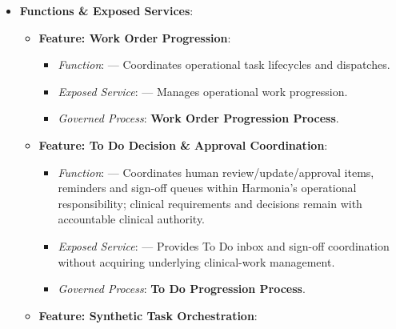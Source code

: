 \begin{itemize}
\item
\textbf{Functions \& Exposed Services}:


\begin{itemize}

\item
\textbf{Feature: Work Order Progression}:


\begin{itemize}

\item
\emph{Function}: \texttt{} — Coordinates operational task lifecycles and dispatches.



\item
\emph{Exposed Service}: \texttt{} — Manages operational work progression.



\item
\emph{Governed Process}: \textbf{Work Order Progression Process}.



\end{itemize}


\item
\textbf{Feature: To Do Decision \& Approval Coordination}:


\begin{itemize}

\item
\emph{Function}: \texttt{} — Coordinates human review/\allowbreak{}update/\allowbreak{}approval items, reminders and sign-off queues within Harmonia's operational responsibility; clinical requirements and decisions remain with accountable clinical authority.



\item
\emph{Exposed Service}: \texttt{} — Provides To Do inbox and sign-off coordination without acquiring underlying clinical-work management.



\item
\emph{Governed Process}: \textbf{To Do Progression Process}.



\end{itemize}


\item
\textbf{Feature: Synthetic Task Orchestration}:



\end{itemize}
\end{itemize}
